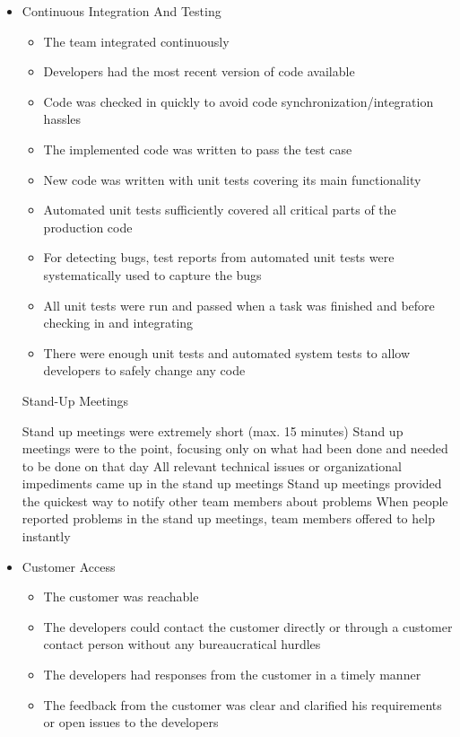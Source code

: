 \begin{appendices}
\begin{itemize}
\begin{itemize}
		\end{itemize}
	\item Continuous Integration And Testing
		\begin{itemize}
			\item The team integrated continuously
			\item Developers had the most recent version of code available
			\item Code was checked in quickly to avoid code synchronization/integration hassles
			\item The implemented code was written to pass the test case
			\item New code was written with unit tests covering its main functionality
			\item Automated unit tests sufficiently covered all critical parts of the production code
			\item For detecting bugs, test reports from automated unit tests were systematically used to capture the bugs
			\item All unit tests were run and passed when a task was finished and before checking in and integrating
			\item There were enough unit tests and automated system tests to allow developers to safely change any code
		\end{itemize}
	\removed Stand-Up Meetings
		\begin{itemize}
			\removed Stand up meetings were extremely short (max. 15 minutes)
			\removed Stand up meetings were to the point, focusing only on what had been done and needed to be done on that day
			\removed All relevant technical issues or organizational impediments came up in the stand up meetings
			\removed Stand up meetings provided the quickest way to notify other team members about problems
			\removed When people reported problems in the stand up meetings, team members offered to help instantly
		\end{itemize}
	\item Customer Access
		\begin{itemize}
			\item The customer was reachable
			\item The developers could contact the customer directly or through a customer contact person without any bureaucratical hurdles
			\item The developers had responses from the customer in a timely manner
			\item The feedback from the customer was clear and clarified his requirements or open issues to the developers

\end{itemize}
\end{itemize}
\end{appendices}
